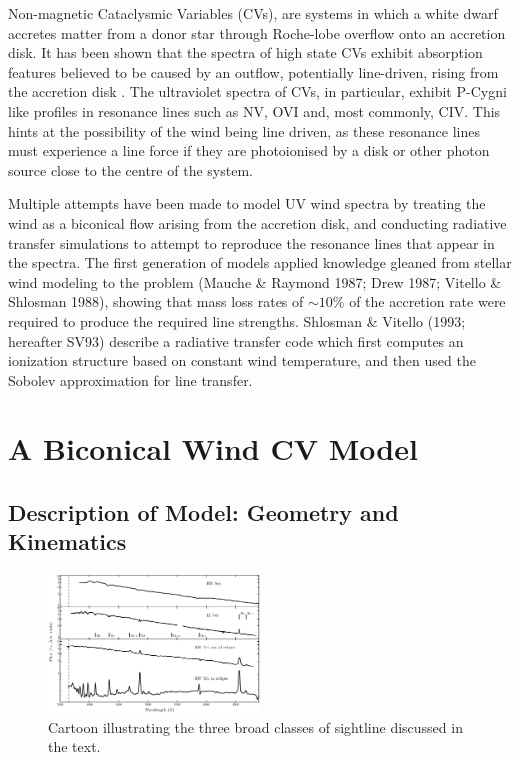 \documentclass[useAMS,usenatbib, onecolumn]{mn2ejm}
\begin{document}
Non-magnetic Cataclysmic Variables (CVs), are systems in which a white dwarf accretes matter from a donor star
through Roche-lobe overflow onto an accretion disk. It has been shown that the spectra of high state CVs
exhibit absorption features believed to be caused by an outflow, potentially line-driven,
rising from the accretion disk \citep{cordova1982}. 
The ultraviolet spectra of CVs, in particular, exhibit P-Cygni like profiles in resonance lines such as 
NV, OVI and, most commonly, CIV. This hints at the possibility of the wind being line driven, 
as these resonance lines must experience a line force if they are photoionised by a disk or other photon source
close to the centre of the system.


Multiple attempts have been made to model UV wind spectra by treating the wind
as a biconical flow arising from the accretion disk, and conducting radiative transfer simulations to attempt
to reproduce the resonance lines that appear in the spectra. The first generation of models
applied knowledge gleaned from stellar wind modeling to the problem (Mauche \& Raymond
1987; Drew 1987; Vitello \& Shlosman 1988), showing that mass loss rates of $\sim10\%$ of the accretion rate
 were required to produce the required line strengths.
Shlosman \& Vitello (1993; hereafter SV93) describe a radiative transfer code which first computes
an ionization structure based on constant wind temperature, and then used the Sobolev approximation
for line transfer.



%
%

\section{A Biconical Wind CV Model}
\subsection{Description of Model: Geometry and Kinematics}
\begin{figure}
\centering
\includegraphics[width=0.5\textwidth]{figures/fig1.eps}
\caption{Cartoon illustrating the three broad classes of sightline discussed in the text.}
\label{cartoon}
\end{figure}
\end{document}
